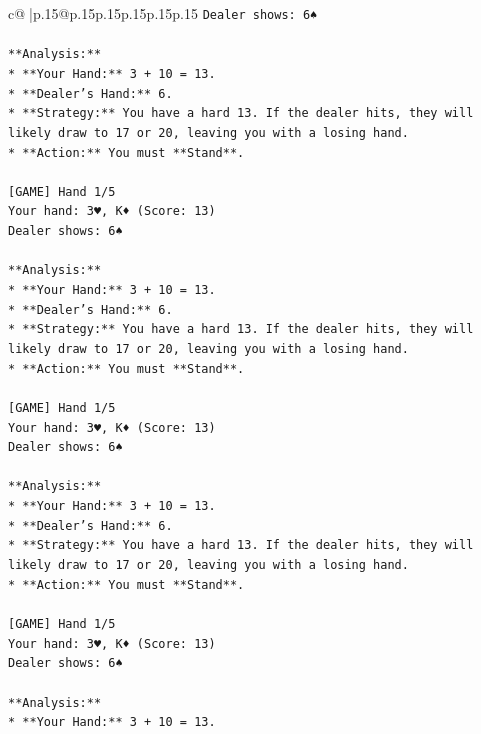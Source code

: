 \documentclass{article}
\begin{document}
{\begin{supertabular}{c@{$\;$}|p{.15\linewidth}@{}p{.15\linewidth}p{.15\linewidth}p{.15\linewidth}p{.15\linewidth}p{.15\linewidth}}
{{{\texttt{Dealer shows: 6♠} \\
\\ 
\texttt{**Analysis:**} \\
\texttt{*   **Your Hand:** 3 + 10 = 13.} \\
\texttt{*   **Dealer's Hand:** 6.} \\
\texttt{*   **Strategy:** You have a hard 13. If the dealer hits, they will likely draw to 17 or 20, leaving you with a losing hand.} \\
\texttt{*   **Action:** You must **Stand**.} \\
\\ 
\texttt{{[}GAME{]} Hand 1/5} \\
\texttt{Your hand: 3♥, K♦ (Score: 13)} \\
\texttt{Dealer shows: 6♠} \\
\\ 
\texttt{**Analysis:**} \\
\texttt{*   **Your Hand:** 3 + 10 = 13.} \\
\texttt{*   **Dealer's Hand:** 6.} \\
\texttt{*   **Strategy:** You have a hard 13. If the dealer hits, they will likely draw to 17 or 20, leaving you with a losing hand.} \\
\texttt{*   **Action:** You must **Stand**.} \\
\\ 
\texttt{{[}GAME{]} Hand 1/5} \\
\texttt{Your hand: 3♥, K♦ (Score: 13)} \\
\texttt{Dealer shows: 6♠} \\
\\ 
\texttt{**Analysis:**} \\
\texttt{*   **Your Hand:** 3 + 10 = 13.} \\
\texttt{*   **Dealer's Hand:** 6.} \\
\texttt{*   **Strategy:** You have a hard 13. If the dealer hits, they will likely draw to 17 or 20, leaving you with a losing hand.} \\
\texttt{*   **Action:** You must **Stand**.} \\
\\ 
\texttt{{[}GAME{]} Hand 1/5} \\
\texttt{Your hand: 3♥, K♦ (Score: 13)} \\
\texttt{Dealer shows: 6♠} \\
\\ 
\texttt{**Analysis:**} \\
\texttt{*   **Your Hand:** 3 + 10 = 13.} \\
}}}
\end{supertabular}}
\end{document}
